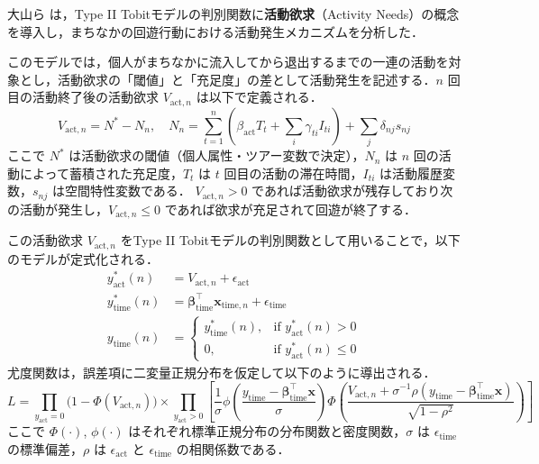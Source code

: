 大山ら \cite{OyamaFukuyamaHato2014} は，Type II Tobitモデルの判別関数に\textbf{活動欲求}（Activity Needs）の概念を導入し，まちなかの回遊行動における活動発生メカニズムを分析した．

このモデルでは，個人がまちなかに流入してから退出するまでの一連の活動を対象とし，活動欲求の「閾値」と「充足度」の差として活動発生を記述する．$n$ 回目の活動終了後の活動欲求 $V_{\mathrm{act}, n}$ は以下で定義される．
\begin{equation}\label{eq:activity_needs}
  V_{\mathrm{act}, n} = N^* - N_n, \quad
  N_n = \sum_{t=1}^{n} \left( \beta_{\mathrm{act}} T_t + \sum_i \gamma_{ti} I_{ti} \right) + \sum_j \delta_{nj} s_{nj}
\end{equation}
ここで $N^*$ は活動欲求の閾値（個人属性・ツアー変数で決定），$N_n$ は $n$ 回の活動によって蓄積された充足度，$T_t$ は $t$ 回目の活動の滞在時間，$I_{ti}$ は活動履歴変数，$s_{nj}$ は空間特性変数である．
$V_{\mathrm{act}, n} > 0$ であれば活動欲求が残存しており次の活動が発生し，$V_{\mathrm{act}, n} \leq 0$ であれば欲求が充足されて回遊が終了する．

この活動欲求 $V_{\mathrm{act}, n}$ をType II Tobitモデルの判別関数として用いることで，以下のモデルが定式化される．
\begin{align}
  y^*_{\mathrm{act}}(n) &= V_{\mathrm{act}, n} + \epsilon_{\mathrm{act}} \label{eq:tobit2_needs_disc}\\
  y^*_{\mathrm{time}}(n) &= \bm{\beta}_{\mathrm{time}}^\top \bm{x}_{\mathrm{time}, n} + \epsilon_{\mathrm{time}} \label{eq:tobit2_needs_cont}\\
  y_{\mathrm{time}}(n) &= \begin{cases} y^*_{\mathrm{time}}(n), & \text{if } y^*_{\mathrm{act}}(n) > 0 \\ 0, & \text{if } y^*_{\mathrm{act}}(n) \leq 0 \end{cases} \label{eq:tobit2_needs_obs}
\end{align}
尤度関数は，誤差項に二変量正規分布を仮定して以下のように導出される．
\begin{equation}\label{eq:tobit2_likelihood}
  L = \prod_{y_{\mathrm{act}}=0} \bigl(1 - \Phi(V_{\mathrm{act},n})\bigr)
  \times \prod_{y_{\mathrm{act}}>0} \left[ \frac{1}{\sigma} \phi\!\left(\frac{y_{\mathrm{time}} - \bm{\beta}_{\mathrm{time}}^\top \bm{x}}{\ \sigma\ }\right) \Phi\!\left(\frac{V_{\mathrm{act},n} + \sigma^{-1}\rho(y_{\mathrm{time}} - \bm{\beta}_{\mathrm{time}}^\top \bm{x})}{\sqrt{1-\rho^2}}\right) \right]
\end{equation}
ここで $\Phi(\cdot)$, $\phi(\cdot)$ はそれぞれ標準正規分布の分布関数と密度関数，$\sigma$ は $\epsilon_{\mathrm{time}}$ の標準偏差，$\rho$ は $\epsilon_{\mathrm{act}}$ と $\epsilon_{\mathrm{time}}$ の相関係数である．

